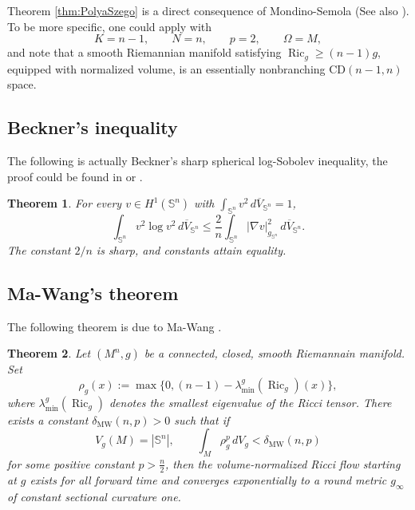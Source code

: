 \documentclass[11pt, reqno]{amsart}
\numberwithin{equation}{section}
\newtheorem{theorem}{Theorem}[section]
\theoremstyle{remark}
\DeclareMathOperator{\Ric}{Ric}
\newcommand{\Sph}{\mathbb S}
\newcommand{\dbarV}[1]{d\overline V_{#1}}
\newcommand{\MW}{\mathrm{MW}}
\begin{document}
Theorem \ref{thm:PolyaSzego} is a direct consequence of Mondino-Semola \cite{MondinoSemola}(See also \cite{BerardMeyer}). To be more specific, one could apply \cite[Definition~1.3, Theorem~1.4, equation (1.5), and Proposition~3.5]{MondinoSemola} with
$$K=n-1,\qquad N=n,\qquad p=2,\qquad\Omega=M,$$
and note that a smooth Riemannian manifold satisfying $\Ric_g\geq(n-1)g$, equipped with
normalized volume, is an essentially nonbranching $\mathrm{CD}(n-1,n)$ space.

\subsection{\bf Beckner's inequality}
The following is actually Beckner's sharp spherical log-Sobolev inequality, the proof could be found in \cite[Theorem~2]{Beckner} or \cite[Corollary 1.1]{DEKM}.
\begin{theorem}\label{thm:Beckner}
For every $v\in H^1(\Sph^n)$ with
$\int_{\Sph^n}v^2\,\dbarV {\Sph^n}=1$,
\begin{equation}\label{eq:Beckner}
\int_{\Sph^n}v^2\log v^2\,\dbarV {\Sph^n}
\leq\frac2n\int_{\Sph^n}|\nabla v|_{g_{\Sph^n}}^2\,\dbarV {\Sph^n}.
\end{equation}
The constant $2/n$ is sharp, and constants attain equality.
\end{theorem}


\subsection{\bf Ma-Wang's theorem}
The following theorem is due to Ma-Wang \cite[Theorem~1.1]{MaWang}.

\begin{theorem}\label{thm:MaWang} 
Let $(M^n,g)$ be a connected, closed, smooth Riemannain manifold.
Set
\begin{equation}\label{eq:rho-def}
\rho_g(x):=\max\{0,(n-1)-\lambda_{\min}^g(\Ric_g)(x)\},
\end{equation}
where $\lambda_{\min}^g(\Ric_g)$ denotes  the smallest eigenvalue of the Ricci
tensor.  There exists a constant $\delta_{\MW}(n,p)>0$ such that  if 
\begin{equation}\label{eq:MW-hypothesis}
V_g(M)=|\Sph^n|,
\qquad
\int_M\rho_g^p\,dV_g<\delta_{\MW}(n,p)
\end{equation}
for some positive constant $p>\frac{n}{2}$, 
then the volume-normalized Ricci flow starting at $g$ exists for all forward time
and converges exponentially  to a round metric $g_\infty$
of constant sectional curvature one.
\end{theorem}
\end{document}

